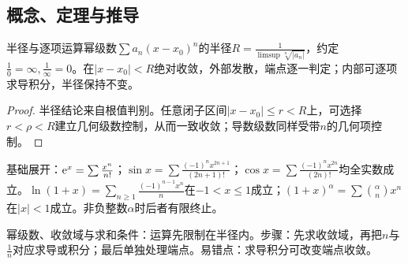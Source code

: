 \subsection{概念、定理与推导}

\begin{theorem}{半径与逐项运算}幂级数$\sum a_n(x-x_0)^n$的半径$R=\frac{1}{\limsup\sqrt[n]{|a_n|}}$，约定$\frac{1}{0}=\infty,\frac{1}{\infty}=0$。在$|x-x_0|<R$绝对收敛，外部发散，端点逐一判定；内部可逐项求导积分，半径保持不变。\end{theorem}
\begin{proof}半径结论来自根值判别。任意闭子区间$|x-x_0|\le r<R$上，可选择$r<\rho<R$建立几何级数控制，从而一致收敛；导数级数同样受带$n$的几何项控制。\end{proof}
基础展开：$\mathrm{e}^x=\sum \frac{x^n}{n!}$；$\sin x=\sum\frac{(-1)^nx^{2n+1}}{(2n+1)!}$；$\cos x=\sum\frac{(-1)^nx^{2n}}{(2n)!}$均全实数成立。$\ln(1+x)=\sum_{n\ge1}\frac{(-1)^{n-1}x^n}{n}$在$-1<x\le1$成立；$(1+x)^\alpha=\sum\binom\alpha n x^n$在$|x|<1$成立。非负整数$\alpha$时后者有限终止。

\begin{method}{幂级数、收敛域与求和}条件：运算先限制在半径内。步骤：先求收敛域，再把$n$与$\frac{1}{n}$对应求导或积分；最后单独处理端点。易错点：求导积分可改变端点收敛。\end{method}
